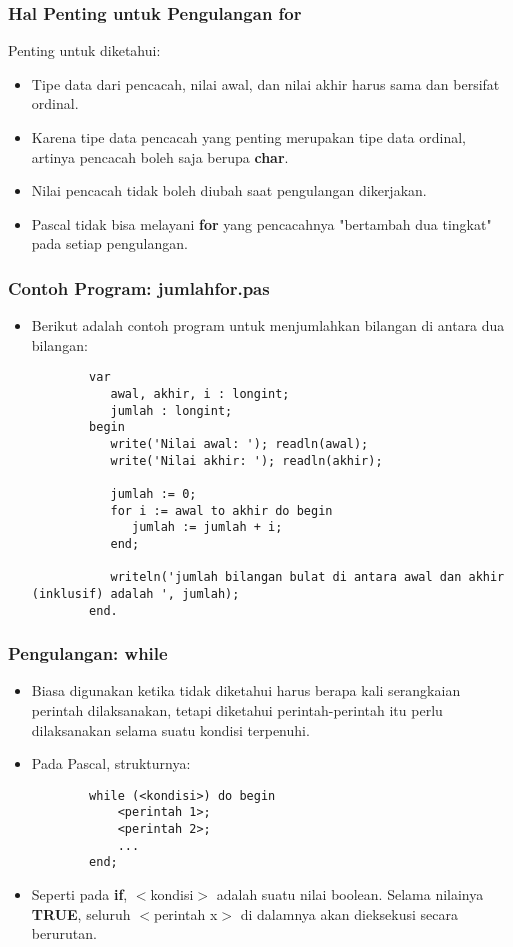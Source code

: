 \documentclass{beamer}
\begin{document}
\begin{frame}
\frametitle{Hal Penting untuk Pengulangan for}
Penting untuk diketahui:
\begin{itemize}
	\item Tipe data dari pencacah, nilai awal, dan nilai akhir harus sama dan bersifat \alert{ordinal}.
	\item Karena tipe data pencacah yang penting merupakan tipe data ordinal, artinya pencacah boleh saja berupa \textbf{char}.
	\item Nilai pencacah tidak boleh diubah saat pengulangan dikerjakan.
	\item Pascal tidak bisa melayani \textbf{for} yang pencacahnya "bertambah dua tingkat" pada setiap pengulangan.
\end{itemize}
\end{frame}

\begin{frame}[fragile]
\frametitle{Contoh Program: jumlahfor.pas}
\begin{itemize}
	\item Berikut adalah contoh program untuk menjumlahkan bilangan di antara dua bilangan:
	\begin{lstlisting}
		var
		   awal, akhir, i : longint;
		   jumlah : longint;
		begin
		   write('Nilai awal: '); readln(awal);
		   write('Nilai akhir: '); readln(akhir);
		
		   jumlah := 0;
		   for i := awal to akhir do begin
		      jumlah := jumlah + i;
		   end;
		
		   writeln('jumlah bilangan bulat di antara awal dan akhir (inklusif) adalah ', jumlah);
		end.
	\end{lstlisting}
\end{itemize}
\end{frame}

\begin{frame}[fragile]
\frametitle{Pengulangan: while}
\begin{itemize}
	\item Biasa digunakan ketika tidak diketahui harus berapa kali serangkaian perintah dilaksanakan, tetapi diketahui perintah-perintah itu perlu dilaksanakan selama suatu kondisi terpenuhi.
	\item Pada Pascal, strukturnya:
	\begin{lstlisting}
		while (<kondisi>) do begin
		    <perintah 1>;
		    <perintah 2>;
		    ...
		end;
	\end{lstlisting}
	\item Seperti pada \textbf{if}, $<$kondisi$>$ adalah suatu nilai boolean. Selama nilainya \textbf{TRUE}, seluruh $<$perintah x$>$ di dalamnya akan dieksekusi secara berurutan.
\end{itemize}
\end{frame}
\end{document}
